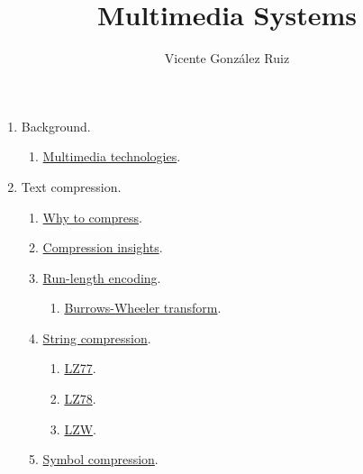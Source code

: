 
\title{Multimedia Systems}
\author{Vicente González Ruiz}

\maketitle

\begin{enumerate}
\item Background.
  \begin{enumerate}
  \item \href{https://tecnologias-multimedia.github.io}{Multimedia technologies}.
  \end{enumerate}
  
\item Text compression.
  \begin{enumerate}
  \item \href{https://cdn.rawgit.com/vicente-gonzalez-ruiz/why_to_compress/master/index.html}{Why to compress}.
  \item \href{https://cdn.rawgit.com/vicente-gonzalez-ruiz/compression_insights/master/index.html}{Compression insights}.
  \item \href{https://cdn.rawgit.com/vicente-gonzalez-ruiz/Run-length_encoding/master/index.html}{Run-length encoding}.
  \begin{enumerate}
  \item \href{https://cdn.rawgit.com/vicente-gonzalez-ruiz/Burrows-Wheeler_transform/master/index.html}{Burrows-Wheeler transform}.
  \end{enumerate}
\item \href{https://cdn.rawgit.com/vicente-gonzalez-ruiz/string_compression/master/index.html}{String compression}.
  \begin{enumerate}
  \item \href{https://cdn.rawgit.com/vicente-gonzalez-ruiz/LZ77/master/index.html}{LZ77}.
  \item \href{https://cdn.rawgit.com/vicente-gonzalez-ruiz/LZ78/master/index.html}{LZ78}.
  \item \href{https://cdn.rawgit.com/vicente-gonzalez-ruiz/LZW/master/index.html}{LZW}.
  \end{enumerate}
\item \href{https://cdn.rawgit.com/vicente-gonzalez-ruiz/symbol_compression/master/index.htm}{Symbol compression}.
  \begin{enumerate}

\end{enumerate}
\end{enumerate}
\end{enumerate}
